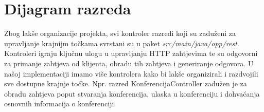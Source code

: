 			\eject


		\section{Dijagram razreda}

		Zbog lakše organizacije projekta, svi kontroler razredi koji su zaduženi za upravljanje krajnijm točkama svrstani su u paket \textit{src/main/java/opp/rest}. Kontroleri igraju ključnu ulogu u upravljanju HTTP zahtjevima te su odgovorni za primanje zahtjeva od klijenta, obradu tih zahtjeva i generiranje odgovora. U našoj implementaciji imamo više kontrolera kako bi lakše organizirali i razdvojili sve dostupne krajnje točke. Npr. razred KonferencijaController zadužen je za obradu zahtjeva poput stvaranja konferencija, ulaska u konferenciju i dohvaćanja osnovnih informacija o konferenciji.

